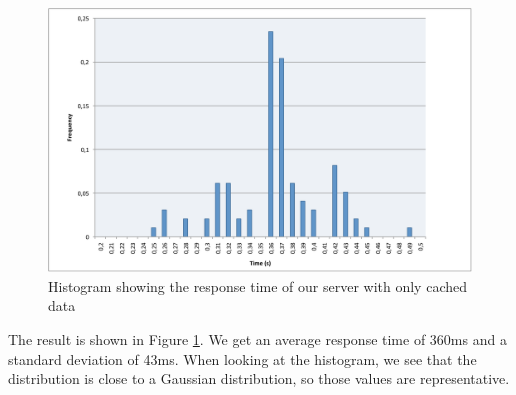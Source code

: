 \begin{figure}[ht]
\center
\includegraphics[scale=0.38]{pics/response_time_cached}
\caption{Histogram showing the response time of our server with only cached data}
\label{fig:response_time_cached}
\end{figure}

The result is shown in Figure \ref{fig:response_time_cached}. We get an average response time of 360ms and a standard deviation of 43ms. When looking at the histogram, we see that the distribution is close to a Gaussian distribution, so those values are representative.
